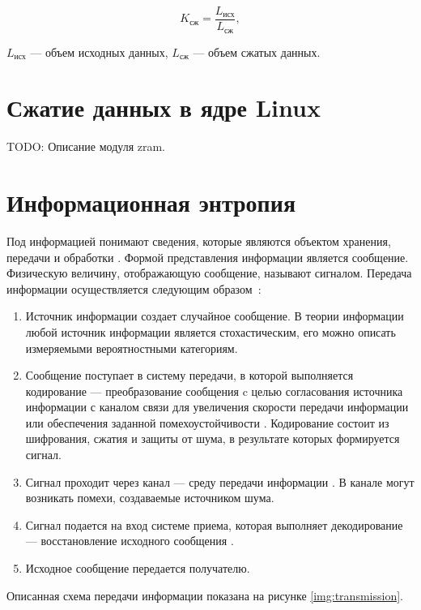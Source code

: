 \begin{equation}
	K_{\text{сж}} = \frac{L_{\text{исх}}}{L_{\text{сж}}},
\end{equation}

 $L_{\text{исх}}$ --- объем исходных данных, $L_{\text{сж}}$ --- объем сжатых данных.

\section{Сжатие данных в ядре Linux}

TODO: Описание модуля zram.

\section{Информационная энтропия}

Под информацией понимают сведения, которые являются объектом хранения, передачи и обработки \cite{information}. Формой представления информации является сообщение. Физическую величину, отображающую сообщение, называют сигналом. Передача информации осуществляется следующим образом~\cite{transmission}:

\begin{enumerate}
	\item Источник информации создает случайное сообщение. В теории информации любой источник информации является стохастическим, его можно описать измеряемыми вероятностными категориям.
	\item Сообщение поступает в систему передачи, в которой выполняется кодирование --- преобразование сообщения c целью согласования источника информации с каналом связи для увеличения скорости передачи информации или обеспечения заданной помехоустойчивости  \cite{information}. Кодирование состоит из шифрования, сжатия и защиты от шума, в результате которых формируется сигнал. 
	\item Сигнал проходит через канал --- среду передачи информации \cite{transmission}. В канале могут возникать помехи, создаваемые источником шума.
	\item Сигнал подается на вход системе приема, которая выполняет декодирование --- восстановление исходного сообщения \cite{information}.
	\item Исходное сообщение передается получателю.
\end{enumerate}

Описанная схема передачи информации показана на рисунке \ref{img:transmission}.

